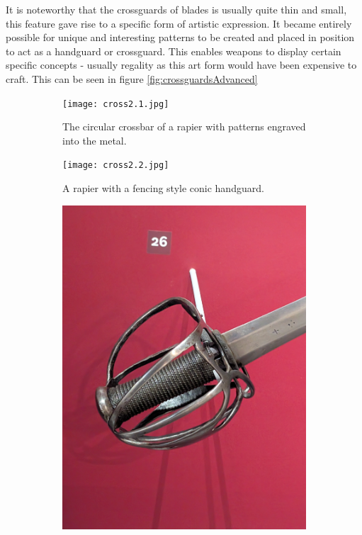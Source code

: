 \documentclass{article}
\begin{document}
It is noteworthy that the crossguards of blades is usually quite thin and small, this feature gave rise to a specific form of artistic expression. It became entirely possible for unique and interesting patterns to be created and placed in position to act as a handguard or crossguard. This enables weapons to display certain specific concepts - usually regality as this art form would have been expensive to craft. This can be seen in figure \ref{fig:crossguardsAdvanced}

\pagebreak

\begin{figure}[H]
    \centering
    \caption{A collection of artistically designed crossbars and handguards.}
    \label{fig:crossguardsAdvanced}
    \begin{subfigure}{0.3\textwidth}
        \centering
        \texttt{[image: cross2.1.jpg]}
        \caption{The circular crossbar of a rapier with patterns engraved into the metal.}
        \label{fig:Cross2.1}
    \end{subfigure}
        \begin{subfigure}{0.3\textwidth}
        \centering
        \texttt{[image: cross2.2.jpg]}
        \caption{A rapier with a fencing style conic handguard.}
        \label{fig:Cross2.2}
    \end{subfigure}
        \begin{subfigure}{0.3\textwidth}
        \centering
        \includegraphics[width=\textwidth]{cross2.4.jpg}

\end{subfigure}
\end{figure}
\end{document}
